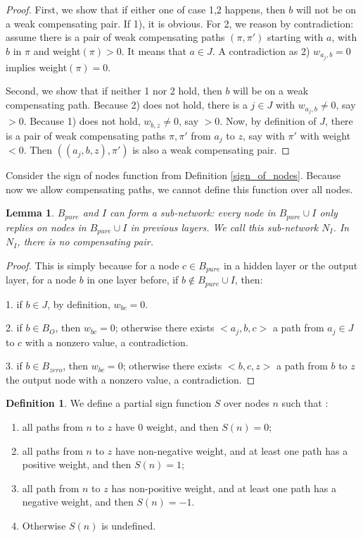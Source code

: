 \documentclass[]{article}
\newtheorem{lemma}{Lemma}
\theoremstyle{definition}
\newtheorem{definition}{Definition}
\begin{document}
\begin{proof}
	First, we show that if either one of case 1,2 happens, then $b$ will not be on a weak compensating pair. If 1), it is obvious. For 2, we reason by contradiction: assume there is a pair of weak compensating paths 	$(\pi,\pi')$ starting with $a$, with $b$ in $\pi$ and weight$(\pi) > 0$. It means that $a \in J$. A contradiction as 2) $w_{a_j,b}=0$ implies weight$(\pi)=0$.
	
	Second, we show that if neither 1 nor 2 hold, then $b$ will be on a weak compensating path.
	Because 2) does not hold, there is a $j \in J$ with $w_{a_j,b} \neq 0$, say $>0$.
	Because 1) does not hold, $w_{b,z} \neq 0$, say $>0$.
	Now, by definition of $J$, there is a pair of weak compensating paths $\pi,\pi'$ 
	from $a_j$ to $z$, say with $\pi'$ with weight $<0$.
	Then $((a_j,b,z), \pi')$ is also a weak compensating pair.
\end{proof}


Consider the sign of nodes function from Definition \ref{sign_of_nodes}. Because now we allow compensating paths, we cannot define this function over all nodes.

\begin{lemma}\label{lem:subnetwork}
	$B_{pure}$ and $I$ can form a sub-network: every node in $B_{pure}\cup I$ only replies on nodes in $B_{pure}\cup I$ in previous layers. We call this sub-network $N_I$. In $N_I$, there is no compensating pair.
\end{lemma}

\begin{proof}
	This is simply because for a node $c\in B_{pure}$ in a hidden layer or the output layer, for a node $b$ in one layer before, if $b\notin B_{pure}\cup I$, then:
	
	1. if $b\in J$, by definition, $w_{bc}=0$.
	
	2. if $b\in B_{O}$, then $w_{bc}=0$; otherwise there exists $<a_j,b,c>$ a path from $a_j\in J$ to $c$ with a nonzero value, a contradiction.
	
	3. if $b\in B_{zero}$, then $w_{bc}=0$; otherwise there exists $<b,c,z>$ a path from $b$ to $z$ the output node with a nonzero value, a contradiction.
	
\end{proof}


\begin{definition}\label{sign_of_nodes_in_I_2}
	We define a partial sign function $S$ over nodes $n$ such that : 	
	\begin{enumerate} 
		\item all paths from $n$ to $z$ have 0 weight, and then $S(n)=0$; 
		\item all paths from $n$ to $z$ have non-negative weight, and at least one path has a positive weight, and then $S(n)=1$; 
		\item all path from $n$ to $z$ has non-positive weight, and at least one path has a negative weight, and then $S(n)=-1$.
		\item Otherwise $S(n)$ is undefined.
	\end{enumerate}
\end{definition}	
\end{document}
